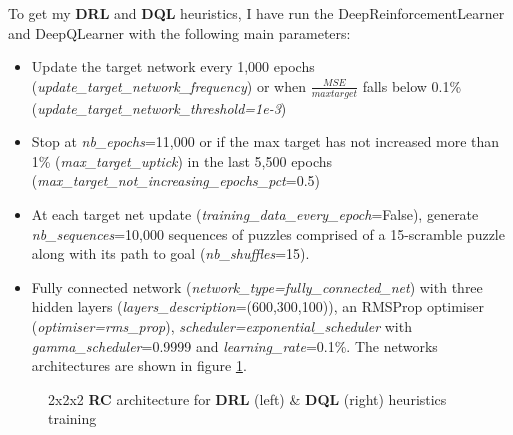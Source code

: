 \label{sec:S33DRL}
To get my \textbf{DRL} and \textbf{DQL} heuristics, I have run the DeepReinforcementLearner and DeepQLearner with the following main parameters:
\begin{itemize}
\item Update the target network every 1,000 epochs (\textit{update\_target\_network\_frequency}) or when $\frac{MSE}{max target}$ falls below 0.1\% (\textit{update\_target\_network\_threshold=1e-3})
\item Stop at \textit{nb\_epochs}=11,000 or if the max target has not increased more than 1\% (\textit{max\_target\_uptick}) in the last 5,500 epochs (\textit{max\_target\_not\_increasing\_epochs\_pct}=0.5)
\item At each target net update (\textit{training\_data\_every\_epoch}=False), generate \textit{nb\_sequences}=10,000 sequences of puzzles comprised of a 15-scramble puzzle along with its path to goal (\textit{nb\_shuffles}=15).
\item Fully connected network (\textit{network\_type=fully\_connected\_net}) with three hidden layers (\textit{layers\_description}=(600,300,100)), an RMSProp optimiser (\textit{optimiser=rms\_prop}), \textit{scheduler=exponential\_scheduler} with \textit{gamma\_scheduler}=0.9999 and \textit{learning\_rate}=0.1\%. The networks architectures are shown in figure \ref{fig:222RCnets}.
\end{itemize}



\begin{figure}[H]
  \noindent
  \caption[222RCnets]{2x2x2 \textbf{RC} architecture for \textbf{DRL} (left) \& \textbf{DQL} (right) heuristics training}
  \label{fig:222RCnets}
\end{figure}


